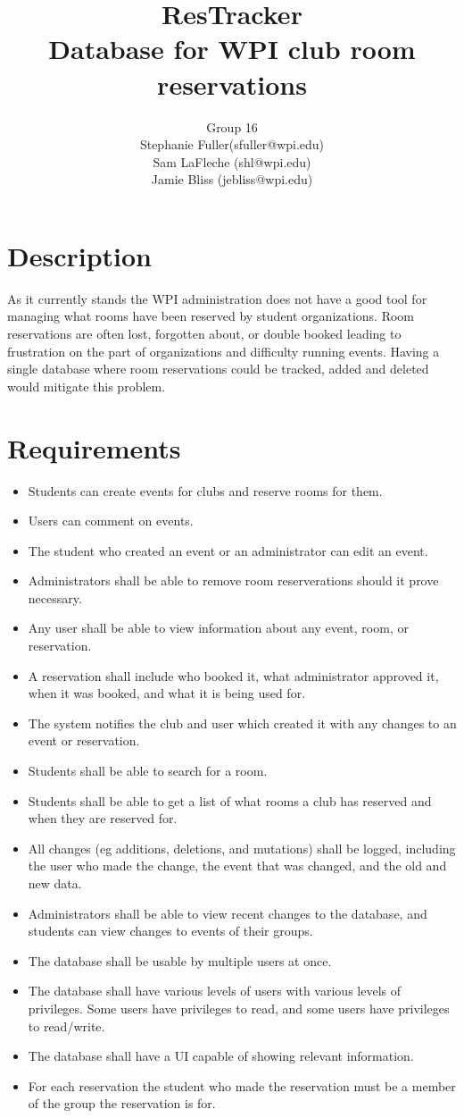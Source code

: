 \documentclass{article}
\title{ResTracker \\ Database for WPI club room reservations}
\author{Group 16 \\ Stephanie Fuller(sfuller@wpi.edu) \\ Sam LaFleche
(shl@wpi.edu) \\ Jamie Bliss (jebliss@wpi.edu)}
\begin{document}
\maketitle

\section{Description}
As it currently stands the WPI administration does not have a good tool for
managing what rooms have been reserved by student organizations. Room
reservations are often lost, forgotten about, or double booked leading to
frustration on the part of organizations and difficulty running events. Having a
single database where room reservations could be tracked, added and deleted
would mitigate this problem.

\section{Requirements}
\begin{itemize}
\item  Students can create events for clubs and reserve rooms for them. 
\item Users can comment on events. 
\item The student who created an event or an administrator can edit an event. 
\item Administrators shall be able to remove room reserverations should it
prove necessary. 
\item Any user shall be able to view information about any event, room, or
reservation.
\item A reservation shall include who booked it, what administrator approved it,
when it was booked, and what it is being used for. 
\item The system notifies the club and user which created it with any changes to
an event or reservation.
\item Students shall be able to search for a room.
\item Students shall be able to get a list of what rooms a club has reserved and when
they are reserved for.
\item All changes (eg additions, deletions, and mutations) shall be logged, including the
user who made the change, the event that was changed, and the old and new data.
\item Administrators shall be able to view recent changes to the database, and
students can view changes to events of their groups. 
\item The database shall be usable by multiple users at once.
\item The database shall have various levels of users with various levels of
privileges. Some users have privileges to read, and some users have privileges to
read/write.
\item The database shall have a UI capable of showing relevant information.
\item For each reservation the student who made the reservation must be a member
of the group the reservation is for. 
\end{itemize}
\end{document}
